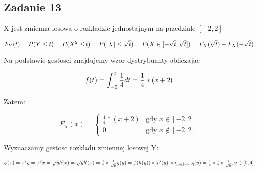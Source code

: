 \subsection{Zadanie 13}

X jest zmienna losowa o rozkladzie jednostajnym na przedziale $[-2,2]$

$$F_Y(t)=P(Y \leq t)=P(X^2 \leq t)=P(|X| \leq \sqrt t)=\\
P(X \in [- \sqrt t, \sqrt t])=F_X(\sqrt t)-F_X(-\sqrt t)$$

Na podstawie gestosci znajdujemy wzor dystrybuanty obliczajac 

$$f(t)=\int_{-2}^{x}\frac{1}{4}dt=\frac{1}{4}*(x+2)\\$$

Zatem:

$$
F_{X}(x)
 = \left\{ \begin{array}{ll}
\frac{1}{4}*(x+2) & \textrm{gdy $x \in [-2,2]$}\\
0 & \textrm{gdy $x \notin [-2,2]$}
\end{array} \right.
$$

Wyznaczamy gestosc rozkladu zmiennej losowej Y:

$\phi(x)=x^2\\
y=x^2\\
x= \sqrt y\\
h(x)= \sqrt y\\
h'(x)= \frac{1}{2}*\frac{1}{\sqrt y}\\
g(y)=f(h(y))*|h'(y)|*\chi_{\phi \in [-2,2]}{(y)}=\frac{1}{4}*\frac{1}{2}*\frac{1}{\sqrt y}, y \in [0,4]
$
